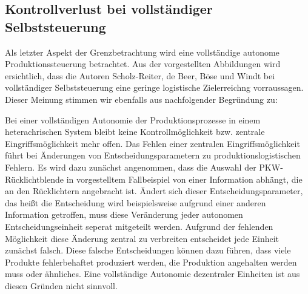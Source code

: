 \subsection{Kontrollverlust bei vollständiger Selbststeuerung}
\label{sec:GrenzenKontrollverlust}

Als letzter Aspekt der Grenzbetrachtung wird eine vollständige autonome Produktionssteuerung betrachtet. Aus der 
vorgestellten Abbildungen wird ersichtlich, dass die Autoren Scholz-Reiter, de Beer, Böse und Windt bei vollständiger 
Selbststeuerung eine geringe logistische Zielerreichng vorraussagen. Dieser Meinung stimmen wir ebenfalls aus nachfolgender 
Begründung zu:

Bei einer vollständigen Autonomie der Produktionsprozesse in einem heterachrischen System bleibt keine Kontrollmöglichkeit 
bzw. zentrale Eingriffsmöglichkeit mehr offen. Das Fehlen einer zentralen Eingriffsmöglichkeit führt bei Änderungen von 
Entscheidungsparametern zu produktionslogistischen Fehlern. 
Es wird dazu zunächst angenommen, dass die Auswahl der PKW-Rücklichtblende in vorgestelltem Fallbeispiel von einer 
Information abhängt, die an den Rücklichtern angebracht ist. Ändert sich dieser Entscheidungsparameter, das heißt die 
Entscheidung wird beispielsweise aufgrund einer anderen Information getroffen, muss diese Veränderung jeder autonomen 
Entscheidungseinheit seperat mitgeteilt werden. Aufgrund der fehlenden Möglichkeit diese Änderung zentral zu verbreiten 
entscheidet jede Einheit zunächst falsch. Diese falsche Entscheidungen können dazu führen, dass viele Produkte 
fehlerbehaftet produziert werden, die Produktion angehalten werden muss oder ähnliches. Eine vollständige Autonomie 
dezentraler Einheiten ist aus diesen Gründen nicht sinnvoll. 
